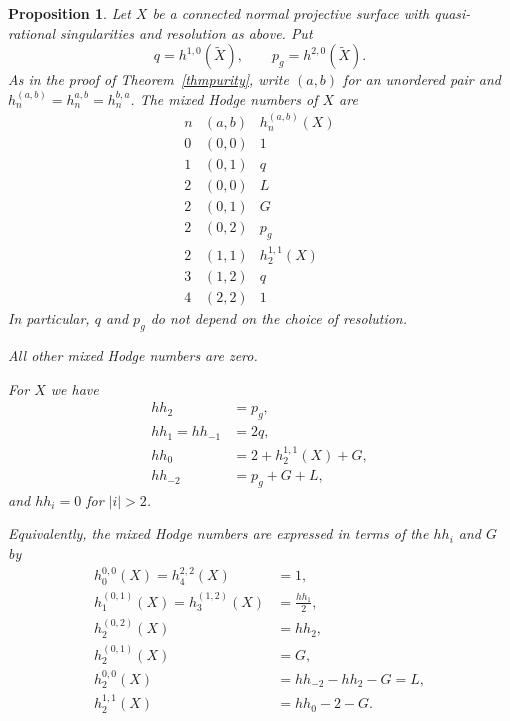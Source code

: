 \documentclass{amsart}
\theoremstyle{plain}
\newtheorem{prop}{Proposition}[section]
\theoremstyle{definition}
\begin{document}
\begin{prop}\label{propsurfaceformulas}
Let $X$ be a connected normal projective surface with quasi-rational singularities and resolution as above. Put
\[
q=h^{1,0}(\widetilde X),\qquad
p_g=h^{2,0}(\widetilde X).
\]
As in the proof of Theorem~\ref{thmpurity}, write $(a,b)$
for an unordered pair and
$h_n^{(a,b)}=h_n^{a,b}=h_n^{b,a}$.
The mixed Hodge numbers of $X$ are
\[
\begin{array}{c|c|c}
n&(a,b)&h_n^{(a,b)}(X)\\\hline
0&(0,0)&1\\
1&(0,1)&q\\
2&(0,0)&L\\
2&(0,1)&G\\
2&(0,2)&p_g\\
2&(1,1)&h_2^{1,1}(X)\\
3&(1,2)&q\\
4&(2,2)&1
\end{array}
\]
In particular, $q$
and $p_g$ do not depend on the choice of resolution.

All other mixed Hodge numbers are zero. 

For $X$ we have
\begin{equation}\label{eqsurfacediagonals}
\begin{aligned}
hh_2&=p_g,\\
hh_1=hh_{-1}&=2q,\\
hh_0&=2+h_2^{1,1}(X)+G,\\
hh_{-2}&=p_g+G+L,
\end{aligned}
\end{equation}
and $hh_i=0$ for $|i|>2$.

Equivalently, the mixed Hodge numbers are expressed in terms of the $hh_i$ and $G$ by
\begin{equation}\label{eqsurfacemixedhodgenumers}
\begin{aligned}
h_0^{0,0}(X)=h_4^{2,2}(X)&=1,\\
h_1^{(0,1)}(X)=h_3^{(1,2)}(X)&=\frac{hh_1}{2},\\
h_2^{(0,2)}(X)&=hh_2,\\
h_2^{(0,1)}(X)&=G,\\
h_2^{0,0}(X)&=hh_{-2}-hh_2-G=L,\\
h_2^{1,1}(X)&=hh_0-2-G.
\end{aligned}
\end{equation}
\end{prop}
\end{document}
